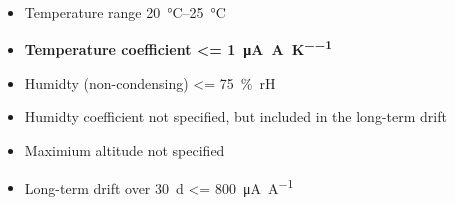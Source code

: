 \begin{center}
    \begin{tcolorbox}[
        new/auto counter,
        new/number within=chapter,
        colback=red!5!white,
        colframe=red!75!black,
        title=Current controller stability specifications,
        width=0.8\linewidth,
        label={lst:dgDrive_specs_environment}
    ]
    \begin{itemize}
        \item Temperature range \qtyrange[text-series-to-math, reset-text-series = false, reset-math-version = false]{20}{25}{\celsius}
        \item \textbf{Temperature coefficient \qty[text-series-to-math, reset-text-series = false, reset-math-version = false]{<= 1}{\uA \per \A \per \K}}
        \item Humidty (non-condensing) \qty{<= 75}{\percent rH}
        \item Humidty coefficient not specified, but included in the long-term drift
        \item Maximium altitude not specified
        \item Long-term drift over \qty{30}{\day} \qty{<= 800}{\uA \per \A}
    \end{itemize}
    \end{tcolorbox}
\end{center}


\clearpage
